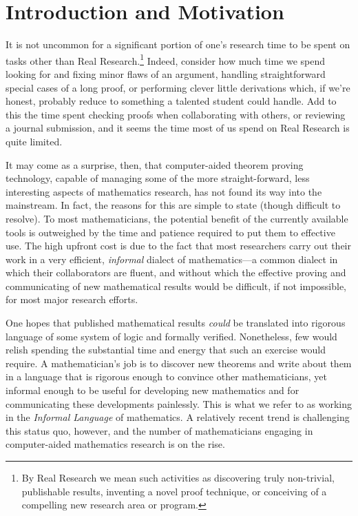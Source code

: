 \documentclass[12pt]{amsart}  %
\begin{document}
\section{Introduction and Motivation}
It is not uncommon for a significant portion of 
one's research time to be spent on tasks other than Real Research.\footnote{By Real Research we mean such activities as discovering truly non-trivial, publishable results, inventing a novel proof technique, or conceiving of a compelling new research area or program.} Indeed, consider how much time we spend looking for and fixing minor flaws of an argument, handling straightforward special cases of a long proof, or performing clever little derivations which, if we're honest, probably reduce to something a talented student could handle.  Add to this the time spent checking proofs when collaborating with others, or reviewing a journal submission, and it seems the time most of us spend on Real Research is quite limited.

It may come as a surprise, then, that computer-aided theorem proving technology,
capable of managing some of the more straight-forward, less interesting aspects 
of mathematics research, has not found its way into the mainstream. In fact, the reasons for this are simple to state (though difficult to resolve). To most mathematicians, the potential benefit of the currently available tools is outweighed by the time and patience required to put them to effective use.  The high upfront cost is due to the fact that most researchers carry out their work in a very efficient, \emph{informal} dialect of mathematics---a common dialect in which their collaborators are fluent, and without which the effective proving and communicating of new mathematical results would be difficult, if not impossible, for most major research efforts.

One hopes that published mathematical results \emph{could} be translated into  rigorous language of some system of logic and formally verified. Nonetheless, few would relish spending the substantial time and energy that such an exercise would require. A mathematician's job is to discover new theorems and write about them in a language that is rigorous enough to convince other mathematicians, yet informal enough to be useful for developing new mathematics and for communicating these developments painlessly. This is what we refer to as working in the \emph{Informal Language} of mathematics.
A relatively recent trend is challenging this status quo, however, and the number of mathematicians engaging in computer-aided mathematics research is on the rise. 
\end{document}
